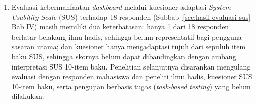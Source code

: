 \begin{enumerate}
	\item Evaluasi kebermanfaatan \textit{dashboard} melalui kuesioner adaptasi \textit{System Usability Scale} (SUS) terhadap 18 responden (Subbab~\ref{sec:hasil-evaluasi-sus} Bab IV) masih memiliki dua keterbatasan: hanya 1 dari 18 responden berlatar belakang ilmu hadis, sehingga belum representatif bagi pengguna sasaran utama; dan kuesioner hanya mengadaptasi tujuh dari sepuluh item baku SUS, sehingga skornya belum dapat dibandingkan dengan ambang interpretasi SUS 10-item baku. Penelitian selanjutnya disarankan mengulang evaluasi dengan responden mahasiswa dan peneliti ilmu hadis, kuesioner SUS 10-item baku, serta pengujian berbasis tugas (\textit{task-based testing}) yang belum dilakukan.
\end{enumerate}
